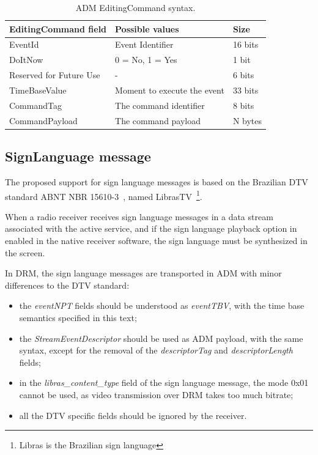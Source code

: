 \documentclass[11pt]{article}
\begin{document}
\begin{appendices}
\begin{table}[H]
\centering
\caption{ADM EditingCommand syntax.}
\label{tableed}
\begin{tabularx}{\textwidth}{|X|X|X|}
  \hline
  EditingCommand field & Possible values & Size\\
  \hline
  EventId & Event Identifier & 16 bits \\
  \hline
  DoItNow & 0 = No, 1 = Yes & 1 bit \\
  \hline
  Reserved for Future Use & - & 6 bits \\
  \hline
  TimeBaseValue & Moment to execute the event & 33 bits \\
  \hline
  CommandTag & The command identifier & 8 bits \\
  \hline
  CommandPayload & The command payload & N bytes \\
  \hline
\end{tabularx}
\end{table}

\subsection{SignLanguage message}
The proposed support for sign language messages is based on the Brazilian DTV
standard ABNT NBR 15610-3~\cite{ABNT-15610-3-2016}, named
LibrasTV~\footnote{Libras is the Brazilian sign language}.

When a radio receiver receives sign language messages in a data stream
associated with the active service, and if the sign language playback option
in enabled in the native receiver software, the sign language must be
synthesized in the screen.

In DRM, the sign language messages are transported in ADM with minor
differences to the DTV standard:

\begin{itemize}
  \item the \emph{eventNPT} fields should be understood as \emph{eventTBV},
        with the time base semantics specified in this text;
  \item the \emph{StreamEventDescriptor} should be used as ADM
        payload, with the same syntax, except for the removal of the
        \emph{descriptorTag} and \emph{descriptorLength} fields;
  \item in the \emph{libras\_content\_type} field of the sign language
        message, the mode 0x01 cannot be used, as video transmission over DRM
        takes too much bitrate;
  \item all the DTV specific fields should be ignored by the receiver.
\end{itemize}

\end{appendices}
\end{document}
